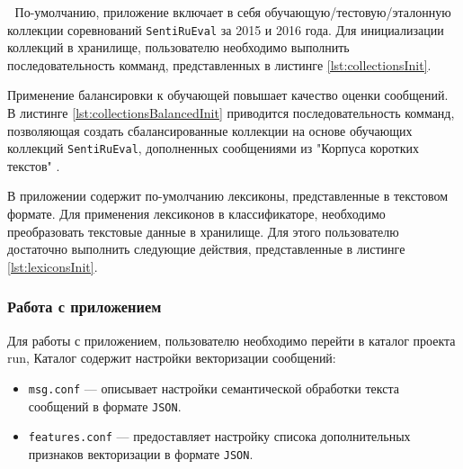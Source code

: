            %
            По-умолчанию, приложение включает в себя обучающую/тестовую/эталонную
            коллекции соревнований {\tt SentiRuEval} за 2015 и 2016 года. Для
            инициализации коллекций в хранилище, пользователю необходимо выполнить
            последовательность комманд, представленных в листинге \ref{lst:collectionsInit}.
            \lstset{style=bash}
            

            Применение балансировки к обучающей повышает качество оценки сообщений.
            \cite{diploma2015} В листинге \ref{lst:collectionsBalancedInit} приводится
            последовательность комманд, позволяющая создать сбалансированные коллекции
            на основе обучающих коллекций {\tt SentiRuEval}, дополненных сообщениями
            из "Корпуса коротких текстов" \cite{rubtsovaCollection}.
            \lstset{style=bash}
            

            В приложении содержит по-умолчанию лексиконы, представленные в текстовом
            формате. Для применения лексиконов в классификаторе, необходимо преобразовать
            текстовые данные в хранилище. Для этого пользователю
            достаточно выполнить следующие действия, представленные в листинге
            \ref{lst:lexiconsInit}.
            \lstset{style=bash}
            

        \subsubsection{Работа с приложением}

            Для работы с приложением, пользователю необходимо перейти в каталог проекта {run},
            Каталог содержит настройки векторизации сообщений:
            \begin{itemize}
                \item {\tt msg.conf} --- описывает настройки семантической обработки текста
                    сообщений в формате {\tt JSON}.
                \item {\tt features.conf} --- предоставляет настройку списока
                    дополнительных признаков векторизации в формате {\tt JSON}.
            \end{itemize}

